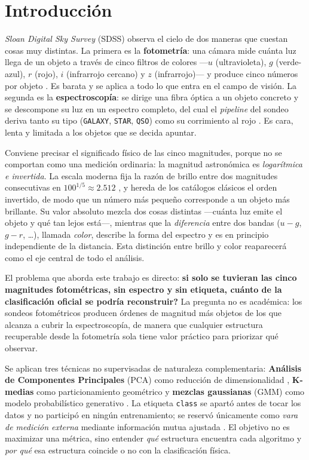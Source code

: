 \documentclass[10pt,journal]{IEEEtran}
\begin{document}
  \section{Introducci\'on}

   \emph{Sloan Digital Sky Survey} (SDSS) observa el cielo de dos maneras que cuestan cosas muy distintas. La primera es la \textbf{fotometr\'ia}: una c\'amara mide cu\'anta luz llega de un objeto a trav\'es de cinco filtros de colores ---$u$ (ultravioleta), $g$ (verde-azul), $r$ (rojo), $i$ (infrarrojo cercano) y $z$ (infrarrojo)--- y produce cinco n\'umeros por objeto \cite{fukugita1996}. Es barata y se aplica a todo lo que entra en el campo de visi\'on. La segunda es la \textbf{espectroscop\'ia}: se dirige una fibra \'optica a un objeto concreto y se descompone su luz en un espectro completo, del cual el \emph{pipeline} del sondeo deriva tanto su tipo (\texttt{GALAXY}, \texttt{STAR}, \texttt{QSO}) como su corrimiento al rojo \cite{bolton2012}. Es cara, lenta y limitada a los objetos que se decida apuntar.

  Conviene precisar el significado f\'isico de las cinco magnitudes, porque no se comportan como una medici\'on ordinaria: la magnitud astron\'omica es \emph{logar\'itmica e invertida}. La escala moderna fija la raz\'on de brillo entre dos magnitudes consecutivas en $100^{1/5} \approx 2.512$ \cite{pogson1856}, y hereda de los cat\'alogos cl\'asicos el orden invertido, de modo que un n\'umero m\'as peque\~no corresponde a un objeto m\'as brillante. Su valor absoluto mezcla dos cosas distintas ---cu\'anta luz emite el objeto y qu\'e tan lejos est\'a---, mientras que la \emph{diferencia} entre dos bandas ($u-g$, $g-r$, \dots), llamada \emph{color}, describe la forma del espectro y es en principio independiente de la distancia. Esta distinci\'on entre brillo y color reaparecer\'a como el eje central de todo el an\'alisis.

  El problema que aborda este trabajo es directo: \textbf{si solo se tuvieran las cinco magnitudes fotom\'etricas, sin espectro y sin etiqueta, \textquestiondown{}cu\'anto de la clasificaci\'on oficial se podr\'ia reconstruir?} La pregunta no es acad\'emica: los sondeos fotom\'etricos producen \'ordenes de magnitud m\'as objetos de los que alcanza a cubrir la espectroscop\'ia, de manera que cualquier estructura recuperable desde la fotometr\'ia sola tiene valor pr\'actico para priorizar qu\'e observar.

  Se aplican tres t\'ecnicas no supervisadas de naturaleza complementaria: \textbf{An\'alisis de Componentes Principales} (PCA) como reducci\'on de dimensionalidad \cite{hotelling1933,jolliffe2016}, \textbf{K-medias} como particionamiento geom\'etrico \cite{macqueen1967,lloyd1982} y \textbf{mezclas gaussianas} (GMM) como modelo probabil\'istico generativo \cite{dempster1977,mclachlan2000}. La etiqueta \texttt{class} se apart\'o antes de tocar los datos y no particip\'o en ning\'un entrenamiento; se reserv\'o \'unicamente como \emph{vara de medici\'on externa} mediante informaci\'on mutua ajustada \cite{vinh2010}. El objetivo no es maximizar una m\'etrica, sino entender \emph{qu\'e} estructura encuentra cada algoritmo y \emph{por qu\'e} esa estructura coincide o no con la clasificaci\'on f\'isica.
\end{document}
